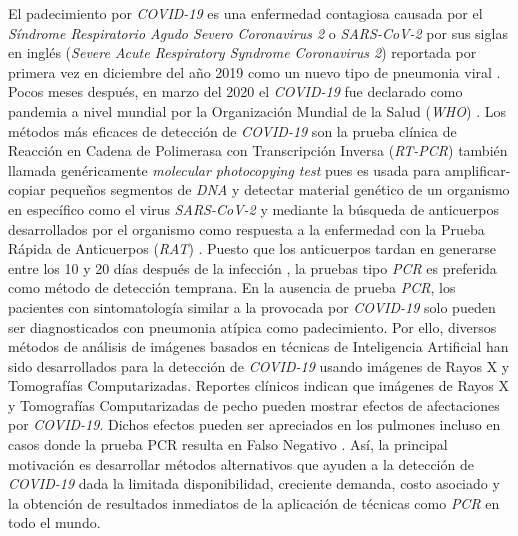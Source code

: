 El padecimiento por \textit{COVID-19} es una enfermedad contagiosa causada por el \textit{Síndrome
Respiratorio Agudo Severo Coronavirus 2} o \textit{SARS-CoV-2} por sus siglas en inglés
(\textit{Severe Acute Respiratory Syndrome Coronavirus 2}) reportada por primera vez en diciembre
del año 2019 como un nuevo tipo de pneumonia viral \cite{huang2020clinical}. Pocos meses después,
en marzo del 2020 el \textit{COVID-19} fue declarado como pandemia a nivel mundial por la
Organización Mundial de la Salud (\textit{WHO}) \cite{world2020director}. Los métodos más eficaces
de detección de \textit{COVID-19} son la prueba clínica de Reacción en Cadena de Polimerasa con
Transcripción Inversa
(\textit{RT-PCR}) también llamada genéricamente \textit{molecular photocopying test} pues es usada
para amplificar-copiar pequeños
segmentos de \textit{DNA} y detectar material genético de un organismo en específico como el virus
\textit{SARS-CoV-2} y mediante la búsqueda de anticuerpos desarrollados por el organismo como
respuesta a la enfermedad con la Prueba Rápida de Anticuerpos (\textit{RAT})
\cite{Gupta2021, Apra2021, pub.1136450856, LIU2021112817}. Puesto que los
anticuerpos tardan en generarse entre los 10 y 20 días después de la infección
\cite{lou2020serology,o2021age,VABRET2020910}, la pruebas tipo \textit{PCR} es preferida como
método de detección temprana. En la ausencia de prueba \textit{PCR}, los pacientes con sintomatología
similar a la provocada por \textit{COVID-19} solo pueden ser diagnosticados con pneumonia atípica
como padecimiento. Por ello, diversos métodos de análisis de imágenes basados en técnicas
de Inteligencia Artificial han sido desarrollados para la detección de \textit{COVID-19} usando
imágenes de Rayos X y Tomografías Computarizadas. Reportes clínicos indican que imágenes de Rayos X
y Tomografías Computarizadas de pecho pueden mostrar efectos de afectaciones por \textit{COVID-19}.
Dichos efectos pueden ser apreciados en los pulmones incluso en casos donde la prueba PCR resulta
en Falso Negativo \cite{ai2020correlation, wong2020frequency}. Así, la principal motivación es
desarrollar métodos alternativos que ayuden a la detección de \textit{COVID-19} dada la limitada
disponibilidad, creciente demanda, costo asociado y la obtención de resultados inmediatos de la
aplicación de técnicas como \textit{PCR} en todo el mundo.

